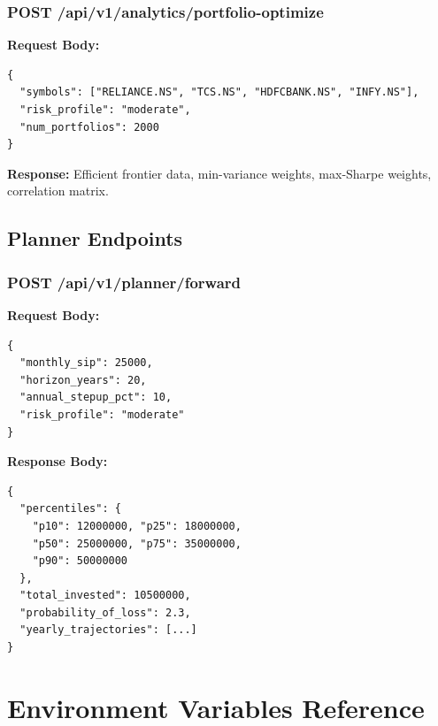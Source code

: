 \documentclass[12pt, a4paper, oneside]{report}
\begin{document}
\begin{appendices}
\subsection{POST /api/v1/analytics/portfolio-optimize}

\textbf{Request Body:}
\begin{lstlisting}[style=pythonstyle, language={}]
{
  "symbols": ["RELIANCE.NS", "TCS.NS", "HDFCBANK.NS", "INFY.NS"],
  "risk_profile": "moderate",
  "num_portfolios": 2000
}
\end{lstlisting}

\textbf{Response:} Efficient frontier data, min-variance weights, max-Sharpe weights, correlation matrix.

\section{Planner Endpoints}

\subsection{POST /api/v1/planner/forward}

\textbf{Request Body:}
\begin{lstlisting}[style=pythonstyle, language={}]
{
  "monthly_sip": 25000,
  "horizon_years": 20,
  "annual_stepup_pct": 10,
  "risk_profile": "moderate"
}
\end{lstlisting}

\textbf{Response Body:}
\begin{lstlisting}[style=pythonstyle, language={}]
{
  "percentiles": {
    "p10": 12000000, "p25": 18000000,
    "p50": 25000000, "p75": 35000000,
    "p90": 50000000
  },
  "total_invested": 10500000,
  "probability_of_loss": 2.3,
  "yearly_trajectories": [...]
}
\end{lstlisting}


\chapter{Environment Variables Reference}
\label{app:env_vars}


\end{appendices}
\end{document}
